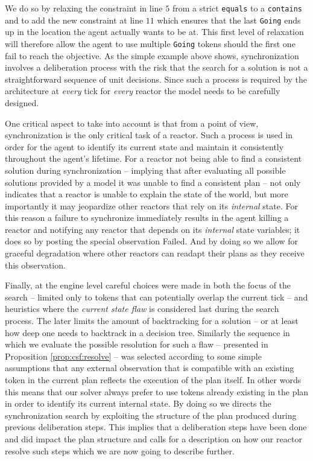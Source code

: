 We do so by relaxing the constraint in line $5$ from a strict
\texttt{equals} to a \texttt{contains} and to add the new constraint
at line $11$ which ensures that the last \texttt{Going} ends up in the
location the agent actually wants to be at. This first level of
relaxation will therefore allow the agent to use multiple
\texttt{Going} tokens should the first one fail to reach the
objective.  %
As the simple example above shows, synchronization involves a
deliberation process with the risk that the search for a solution is
not a straightforward sequence of unit decisions. Since such a process
is required by the architecture at \emph{every} tick for \emph{every}
reactor the model needs to be carefully designed.

One critical aspect to take into account is that from a \rx point of
view, synchronization is the only critical task of a reactor. Such a
process is used in order for the agent to identify its current state
and maintain it consistently throughout the agent's lifetime. For a
reactor not being able to find a consistent solution during
synchronization -- implying that after evaluating all possible
solutions provided by a model it was unable to find a consistent plan
-- not only indicates that a reactor is unable to explain the state of
the world, but more importantly it may jeopardize other reactors that
rely on its {\em internal} state. For this reason a failure to
synchronize immediately results in the agent killing a reactor and
notifying any reactor that depends on its {\em internal} state
variables; it does so by posting the special observation
\textsf{Failed}. And by doing so we allow for graceful degradation
where other reactors can readapt their plans as they receive this
observation.

Finally, at the engine level careful choices were made in 
both the focus of the search -- limited only to tokens that 
can potentially overlap the current tick -- and heuristics where 
the {\em current state flaw} is considered last during the search
process. The later limits the amount of backtracking for a solution 
-- or at least how deep one needs to backtrack in a decision tree. 
Similarly the sequence in which we evaluate the possible resolution 
for such a flaw -- presented in Proposition \ref{prop:csf:resolve} -- 
was selected according to  some simple assumptions that any external 
observation that is compatible with an existing token in the current
plan reflects the execution of the plan itself. In other words this
means that our solver always prefer to use tokens already existing in
the plan in order to identify its current internal state. By doing so
we directs the synchronization search by exploiting the structure of
the plan produced during previous deliberation steps. This implies
that a deliberation steps have been done and did impact the plan
structure and calls for a description on how our \eu reactor resolve
such steps which we are now going to describe further.


